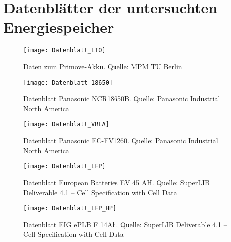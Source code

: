 \appendix
\chapter{Datenblätter der untersuchten Energiespeicher}
\label{an_Datenblaetter}
\begin{figure}[h!]\centering
	\texttt{[image: Datenblatt\_LTO]}
	\caption[Daten zum Primove-Akku]{Daten zum Primove-Akku. Quelle: MPM TU Berlin}
	\label{datasheet_LTO}
\end{figure}

\begin{figure}\centering
	\texttt{[image: Datenblatt\_18650]}
	\caption[Datenblatt Panasonic NCR18650B]{Datenblatt Panasonic NCR18650B. Quelle: Panasonic Industrial North America}
	\label{datasheet_18650}
\end{figure}

\begin{figure}\centering
	\texttt{[image: Datenblatt\_VRLA]}
	\caption[Datenblatt Panasonic EC-FV1260]{Datenblatt Panasonic EC-FV1260. Quelle: Panasonic Industrial North America}
	\label{datasheet_Blei}
\end{figure}

\begin{figure}\centering
	\texttt{[image: Datenblatt\_LFP]}
	\caption[Datenblatt European Batteries EV 45 Ah]{Datenblatt European Batteries EV 45 AH. Quelle: SuperLIB Deliverable 4.1 – Cell Specification with Cell Data}
	\label{datasheet_LFP_HE}
\end{figure}

\begin{figure}\centering
	\texttt{[image: Datenblatt\_LFP\_HP]}
	\caption[Datenblatt EIG ePLB F 14 Ah]{Datenblatt EIG ePLB F 14Ah. Quelle: SuperLIB Deliverable 4.1 – Cell Specification with Cell Data}
	\label{datasheet_LFP_HP}
\end{figure}